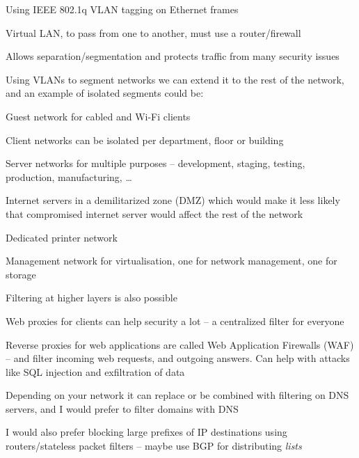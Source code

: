 \documentclass[Screen16to9,17pt]{foils}
\begin{document}


\begin{list1}
\item Using IEEE 802.1q  VLAN tagging on Ethernet frames
\item Virtual LAN, to pass from one to another, must use a router/firewall
\item Allows separation/segmentation and protects traffic from many security issues
\end{list1}


Using VLANs to segment networks we can extend it to the rest of the network, and an example of isolated segments could be:
\begin{list2}
\item Guest network for cabled and Wi-Fi clients
\item Client networks can be isolated per department, floor or building
\item Server networks for multiple purposes – development, staging, testing, production, manufacturing, …
\item Internet servers in a demilitarized zone (DMZ) which would make it less likely that compromised internet
server would affect the rest of the network
\item Dedicated printer network
\item Management network for virtualisation, one for network management, one for storage
\end{list2}




\begin{list2}
\item Filtering at higher layers is also possible
\item Web proxies for clients can help security a lot -- a centralized filter for everyone

\item Reverse proxies for web applications are called
Web Application Firewalls (WAF) -- and filter incoming web requests, and outgoing answers. Can help with attacks like SQL injection and exfiltration of data
\item Depending on your network it can replace or be combined with filtering on DNS servers, and I would prefer to filter domains with DNS
\item I would also prefer blocking large prefixes of IP destinations using routers/stateless packet filters -- maybe use BGP for distributing \emph{lists}
\end{list2}
\end{document}
